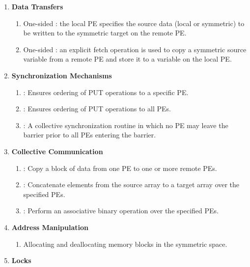 \begin{enumerate}
\item \textbf{Data Transfers }

\begin{enumerate}
\item One-sided  : the local \ac{PE} specifies the source
data (local or symmetric) to be written to the symmetric target on the remote \ac{PE}. 
\item One-sided  : an explicit fetch operation is used to copy a symmetric source variable
from a remote \ac{PE} and store it to a variable on the local \ac{PE}.\end{enumerate}


\item \textbf{Synchronization Mechanisms }

\begin{enumerate}
\item {}: Ensures ordering of PUT operations to a specific \ac{PE}. 
\item {}: Ensures ordering of PUT operations to all \ac{PE}s. 
\item {}: A collective synchronization routine in which no \ac{PE} may leave
the barrier prior to all \ac{PE}s entering the barrier. 
\end{enumerate}
\item \textbf{Collective Communication}

\begin{enumerate}
\item {}: Copy a block of data from one \ac{PE} to one or more remote
PEs. 
\item {}: Concatenate elements from the source array to a target
array over the specified \ac{PE}s. 
\item {}: Perform an associative binary operation over the specified
\ac{PE}s. 
\end{enumerate}
\item \textbf{Address Manipulation}

\begin{enumerate}
\item Allocating and deallocating memory blocks in the symmetric space.
\end{enumerate}
\item \textbf{Locks}


\end{enumerate}
